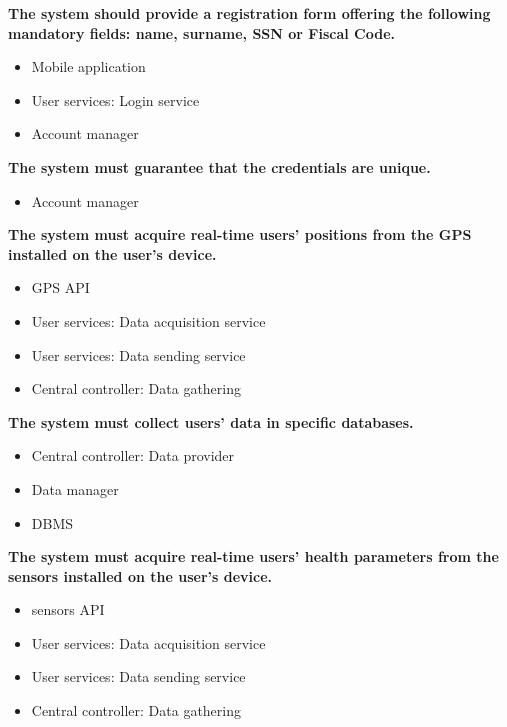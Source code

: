 \begin{enumerate} [label={\bf[R\arabic*]}]
    \item \textbf{The system should provide a registration form offering the following mandatory fields: name, surname, SSN or Fiscal Code.}
        \begin{itemize}
            \item Mobile application
            \item User services: Login service
            \item Account manager
        \end{itemize}
    \item \textbf{The system must guarantee that the credentials are unique.}
        \begin{itemize}
            \item Account manager
        \end{itemize}
    \item \textbf{The system must acquire real-time users' positions from the GPS installed on the user's device.}
        \begin{itemize}
            \item GPS API
            \item User services: Data acquisition service
            \item User services: Data sending service
            \item Central controller: Data gathering
        \end{itemize}
    \clearpage
    \item \textbf{The system must collect users' data in specific databases.}
        \begin{itemize}
            \item Central controller: Data provider
            \item Data manager
            \item DBMS
        \end{itemize}
    \item \textbf{The system must acquire real-time users' health parameters from the sensors installed on the user's device.}
        \begin{itemize}
            \item sensors API
            \item User services: Data acquisition service
            \item User services: Data sending service
            \item Central controller: Data gathering

\end{itemize}
\end{enumerate}
